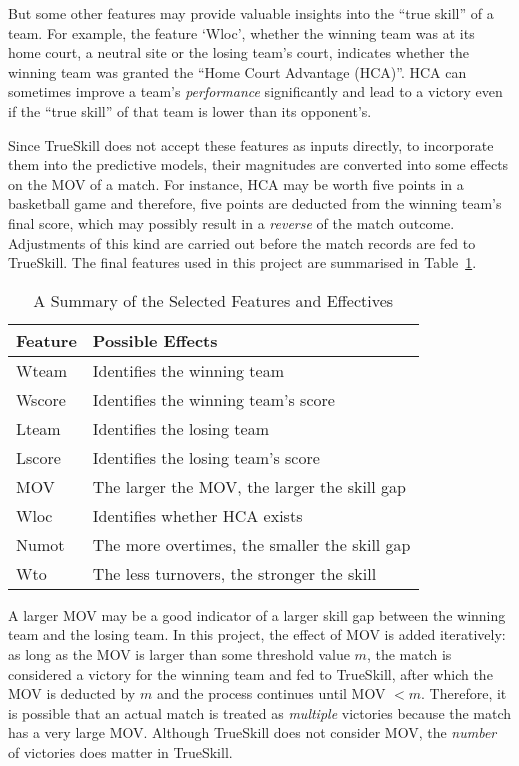 But some other features may provide valuable insights into the ``true skill'' of a team. For example, the feature `Wloc', whether the winning team was at its home court, a neutral site or the losing team's court, indicates whether the winning team was granted the ``Home Court Advantage (HCA)''. HCA can sometimes improve a team's \emph{performance} significantly and lead to a victory even if the ``true skill'' of that team is lower than its opponent's. 

Since TrueSkill does not accept these features as inputs directly, to incorporate them into the predictive models, their magnitudes are converted into some effects on the MOV of a match. For instance, HCA may be worth five points in a basketball game and therefore, five points are deducted from the winning team's final score, which may possibly result in a \emph{reverse} of the match outcome. Adjustments of this kind are carried out before the match records are fed to TrueSkill. The final features used in this project are summarised in Table~\ref{Ta:sele_feature}. 

\begin{table}[h!]
\centering
\begin{tabular}{ | l | l | }
\hline
\textbf{Feature} & \textbf{Possible Effects} \\ \hline
Wteam & Identifies the winning team \\ \hline
Wscore & Identifies the winning team's score \\ \hline
Lteam &  Identifies the losing team \\ \hline
Lscore & Identifies the losing team's score \\ \hline
MOV & The larger the MOV, the larger the skill gap \\\hline 
Wloc & Identifies whether HCA exists \\ \hline
Numot & The more overtimes, the smaller the skill gap \\ \hline
Wto & The less turnovers, the stronger the skill \\ \hline
\end{tabular}
\caption{A Summary of the Selected Features and Effectives}\label{Ta:sele_feature}
\end{table}

A larger MOV may be a good indicator of a larger skill gap between the winning team and the losing team. In this project, the effect of MOV is added iteratively: as long as the MOV is larger than some threshold value $m$, the match is considered a victory for the winning team and fed to TrueSkill, after which the MOV is deducted by $m$ and the process continues until MOV $<m$. Therefore, it is possible that an actual match is treated as \emph{multiple} victories because the match has a very large MOV. Although TrueSkill does not consider MOV, the \emph{number} of victories does matter in TrueSkill. 

